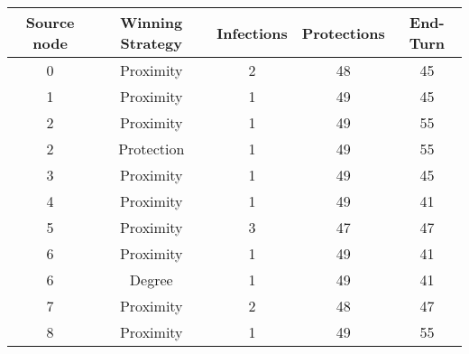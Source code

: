 \documentclass[results.tex]{subfiles}
\begin{document}
    \begin{center}
        \begin{tabular}{| c || c | c | c | c |}
            \hline
            {\bfseries Source node} & {\bfseries Winning Strategy} & {\bfseries Infections} & {\bfseries Protections}
            & {\bfseries End-Turn}
            \\  %
            \hline\hline
            0                       & Proximity                    & 2                      & 48                      & 45                   \\
            \hline
            1                       & Proximity                    & 1                      & 49                      & 45                   \\
            \hline
            2                       & Proximity                    & 1                      & 49                      & 55                   \\
            \hline
            2                       & Protection                   & 1                      & 49                      & 55                   \\
            \hline
            3                       & Proximity                    & 1                      & 49                      & 45                   \\
            \hline
            4                       & Proximity                    & 1                      & 49                      & 41                   \\
            \hline
            5                       & Proximity                    & 3                      & 47                      & 47                   \\
            \hline
            6                       & Proximity                    & 1                      & 49                      & 41                   \\
            \hline
            6                       & Degree                       & 1                      & 49                      & 41                   \\
            \hline
            7                       & Proximity                    & 2                      & 48                      & 47                   \\
            \hline
            8                       & Proximity                    & 1                      & 49                      & 55                   \\

\end{tabular}
\end{center}
\end{document}
